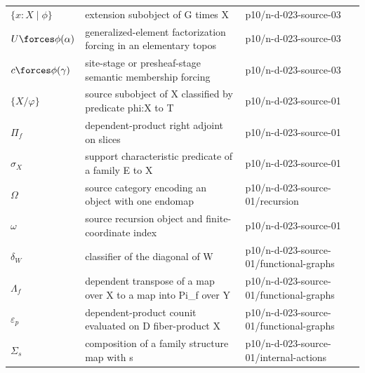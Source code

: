 \begin{longtable}{@{}p{}p{}p{}@{}}
\(\{x:X\mid\phi\}\) & extension subobject of G times X & p10/\allowbreak{}n-\allowbreak{}d-\allowbreak{}023-\allowbreak{}source-\allowbreak{}03 \\
\(U\forces\phi(\alpha)\) & generalized-element factorization forcing in an elementary topos & p10/\allowbreak{}n-\allowbreak{}d-\allowbreak{}023-\allowbreak{}source-\allowbreak{}03 \\
\(c\forces\phi(\gamma)\) & site-stage or presheaf-stage semantic membership forcing & p10/\allowbreak{}n-\allowbreak{}d-\allowbreak{}023-\allowbreak{}source-\allowbreak{}03 \\
\(\{X/\varphi\}\) & source subobject of X classified by predicate phi:X to T & p10/\allowbreak{}n-\allowbreak{}d-\allowbreak{}023-\allowbreak{}source-\allowbreak{}01 \\
\(\Pi_f\) & dependent-product right adjoint on slices & p10/\allowbreak{}n-\allowbreak{}d-\allowbreak{}023-\allowbreak{}source-\allowbreak{}01 \\
\(\sigma_X\) & support characteristic predicate of a family E to X & p10/\allowbreak{}n-\allowbreak{}d-\allowbreak{}023-\allowbreak{}source-\allowbreak{}01 \\
\(\Omega\) & source category encoding an object with one endomap & p10/\allowbreak{}n-\allowbreak{}d-\allowbreak{}023-\allowbreak{}source-\allowbreak{}01/\allowbreak{}recursion \\
\(\omega\) & source recursion object and finite-coordinate index & p10/\allowbreak{}n-\allowbreak{}d-\allowbreak{}023-\allowbreak{}source-\allowbreak{}01 \\
\(\delta_W\) & classifier of the diagonal of W & p10/\allowbreak{}n-\allowbreak{}d-\allowbreak{}023-\allowbreak{}source-\allowbreak{}01/\allowbreak{}functional-\allowbreak{}graphs \\
\(\Lambda_f\) & dependent transpose of a map over X to a map into Pi\_f over Y & p10/\allowbreak{}n-\allowbreak{}d-\allowbreak{}023-\allowbreak{}source-\allowbreak{}01/\allowbreak{}functional-\allowbreak{}graphs \\
\(\varepsilon_p\) & dependent-product counit evaluated on D fiber-product X & p10/\allowbreak{}n-\allowbreak{}d-\allowbreak{}023-\allowbreak{}source-\allowbreak{}01/\allowbreak{}functional-\allowbreak{}graphs \\
\(\Sigma_s\) & composition of a family structure map with s & p10/\allowbreak{}n-\allowbreak{}d-\allowbreak{}023-\allowbreak{}source-\allowbreak{}01/\allowbreak{}internal-\allowbreak{}actions \\

\end{longtable}
